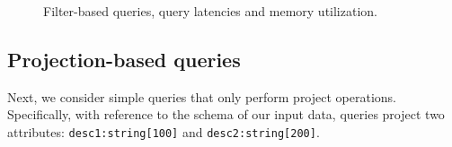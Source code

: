 \begin{figure}[htbp]
	\centering



   \caption{Filter-based queries, query latencies and memory utilization.}
   \label{fig:query1_80_50}
\end{figure}


\subsection{Projection-based queries}
Next, we consider simple queries that only perform project operations. Specifically, with reference to the schema of our input data, queries project two attributes: \texttt{desc1:string[100]} and \texttt{desc2:string[200]}.

